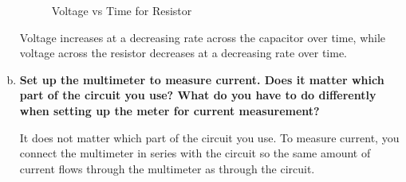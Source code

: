 \documentclass[article, 12pt]{article}
\begin{document}
\begin{enumerate}[a)]
\begin{figure}[H]
            \caption{Voltage vs Time for Resistor}
            \label{fig:resistor}
        \end{figure}
        
        Voltage increases at a decreasing rate across the capacitor over time, while voltage across the resistor decreases at a decreasing rate over time.
        \item \textbf{Set up the multimeter to measure current. Does it matter which part of the circuit you use? What do you have to do differently when setting up the meter for current measurement?}
        
        It does not matter which part of the circuit you use. To measure current, you connect the multimeter in series with the circuit so the same amount of current flows through the multimeter as through the circuit.
    \end{enumerate}
\end{document}
